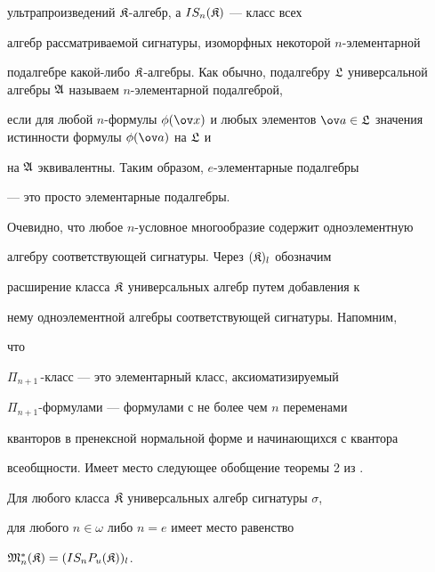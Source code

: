 ультрапроизведений $\frak K$-алгебр, а $IS_n(\frak K)$ --- класс всех 


алгебр рассматриваемой сигнатуры, изоморфных некоторой $n$-элементарной 


подалгебре какой-либо $\frak K$-алгебры. Как обычно, подалгебру $\frak 


L$ универсальной алгебры $\frak A$ называем $n$-элементарной подалгеброй, 


если для любой $n$-формулы $\phi(\ov x)$ и любых элементов $\ov 


a\in\frak L$ значения истинности формулы $\phi(\ov a)$ на $\frak L$ и 


на $\frak A$ эквивалентны. Таким образом, $e$-элементарные подалгебры 


--- это просто элементарные подалгебры. 


 


Очевидно, что любое $n$-условное многообразие содержит одноэлементную 


алгебру соответствующей сигнатуры. Через $(\frak K)_l$ обозначим 


расширение класса $\frak K$ универсальных алгебр путем добавления к 


нему одноэлементной алгебры соответствующей сигнатуры. Напомним,


что\linebreak


$\Pi_{n+1}$\,-класс --- это элементарный класс, аксиоматизируемый 


$\Pi_{n+1}$-формулами --- формулами с не более чем $n$ переменами 


кванторов в пренексной нормальной форме и начинающихся с квантора 


всеобщности. Имеет место следующее обобщение теоремы 2 из \cite{1}. 


 


\begin{thm} 


Для любого класса $\frak K$ универсальных алгебр сигнатуры $\sigma$, 


для любого $n\in\omega$ либо $n=e$ имеет место равенство 


$\frak M^*_n(\frak K)=(IS_n P_u(\frak K))_l$. 


\end{thm} 


 


